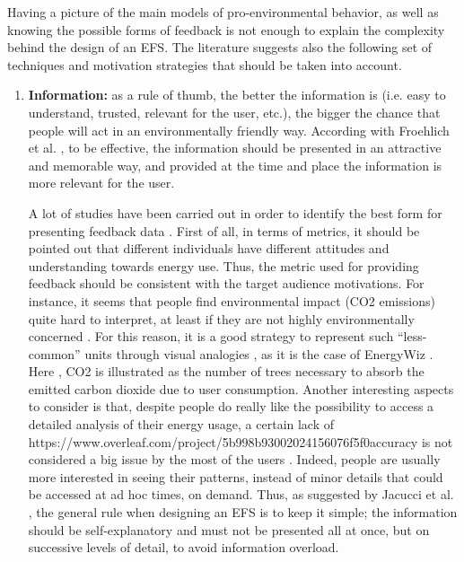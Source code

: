 Having a picture of the main models of pro-environmental behavior, as well as knowing the possible forms of feedback is not enough to explain the complexity behind the design of an \ac{EFS}. The literature suggests also the following set of techniques and motivation strategies that should be taken into account.


\begin{enumerate}
    \item \textbf{Information:} as a rule of thumb, the better the information is (i.e. easy to understand, trusted, relevant for the user, etc.), the bigger the chance that people will act in an environmentally friendly way. According with Froehlich et al. \cite{Froehlich2010}, to be effective, the information should be presented in an attractive and memorable way, and provided at the time and place the information is more relevant for the user.
    
A lot of studies have been carried out in order to identify the best form for presenting feedback data \cite{Fitzpatrick2009, Giulio2009, Petkov2011, Strengers2011}. First of all, in terms of metrics, it should be pointed out that different individuals have different attitudes and understanding towards energy use. Thus, the metric used for providing feedback should be consistent with the target audience motivations. For instance, it seems that people find environmental impact (CO2 emissions) quite hard to interpret, at least if they are not highly environmentally concerned \cite{Fitzpatrick2009}. For this reason, it is a good strategy to represent such “less-common” units through visual analogies \cite{Strengers2011}, as it is the case of EnergyWiz \cite{Petkov2011} . Here , CO2 is illustrated as the number of trees necessary to absorb the emitted carbon dioxide due to user consumption. Another interesting aspects to consider is that, despite people do really like the possibility to access a detailed analysis of their energy usage, a certain lack of https://www.overleaf.com/project/5b998b93002024156076f5f0accuracy is not considered a big issue by the most of the users \cite{Fitzpatrick2009}. Indeed, people are usually more interested in seeing their patterns, instead of minor details that could be accessed at ad hoc times, on demand. Thus, as suggested by Jacucci et al. \cite{Giulio2009}, the general rule when designing an \ac{EFS} is to keep it simple; the information should be self-explanatory and must not be presented all at once, but on successive levels of detail, to avoid information overload.


\end{enumerate}
